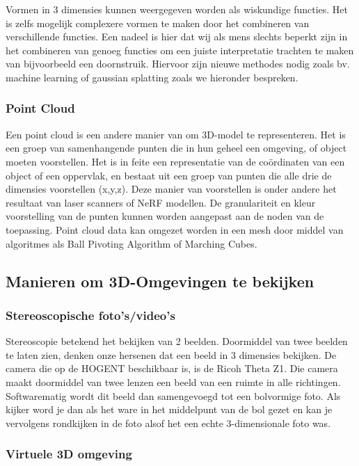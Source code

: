 Vormen in 3 dimensies kunnen weergegeven worden als wiskundige functies. Het is zelfs mogelijk complexere vormen te maken door het combineren van verschillende functies. Een nadeel is hier dat wij als mens slechts beperkt zijn in het combineren van genoeg functies om een juiste interpretatie trachten te maken van bijvoorbeeld een doornstruik.  Hiervoor zijn nieuwe methodes nodig zoals bv.  machine learning  of gaussian splatting zoals we hieronder bespreken. \autocite{Tancik2023}

\subsubsection{Point Cloud}

Een point cloud is een andere manier van om 3D-model te representeren. Het is een groep van samenhangende punten die in hun geheel een omgeving, of object moeten voorstellen. Het is in feite een representatie van de coördinaten van een object of een oppervlak, en bestaat uit een groep van punten die alle drie de dimensies voorstellen (x,y,z). \autocite{Sai2023}
Deze manier van voorstellen is onder andere het resultaat van laser scanners of NeRF modellen. De granulariteit en kleur voorstelling van de punten kunnen worden aangepast aan de noden van de toepassing. 
Point cloud data kan omgezet worden in een mesh door middel van algoritmes als Ball Pivoting Algorithm of Marching Cubes. \autocite{Fisher2014}

\subsection{Manieren om 3D-Omgevingen te bekijken}
\subsubsection{Stereoscopische foto’s/video’s }

Stereoscopie betekend het bekijken van 2 beelden. Doormiddel van twee beelden te laten zien, denken onze hersenen dat een beeld in 3 dimensies bekijken. De camera die op de HOGENT beschikbaar is, is de Ricoh Theta Z1. Die camera maakt doormiddel van twee lenzen een beeld van een ruimte in alle richtingen. Softwarematig wordt dit beeld dan samengevoegd tot een bolvormige foto. Als kijker word je dan als het ware in het middelpunt van de bol gezet en kan je vervolgens rondkijken in de foto alsof het een echte 3-dimensionale foto was. 

\subsubsection{Virtuele 3D omgeving}

